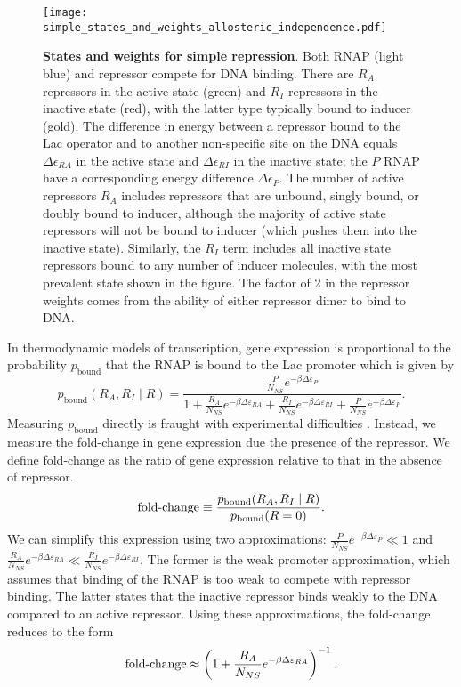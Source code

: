 \begin{figure}[h]
	\centering \texttt{[image: simple\_states\_and\_weights\_allosteric\_independence.pdf]}
	\caption{{\bf States and weights for simple repression}. Both RNAP (light blue)
		and repressor compete for DNA binding. There are $R_A$ repressors in the active
		state (green) and $R_I$ repressors in the inactive state (red), with the latter
		type typically bound to inducer (gold). The difference in energy between a
		repressor bound to the Lac operator and to another non-specific site on the DNA
		equals $\Delta\epsilon_{RA}$ in the active state and $\Delta\epsilon_{RI}$
		in the inactive state; the $P$ RNAP have a corresponding energy difference
		$\Delta\epsilon_{P}$. The number of active repressors $R_A$ includes
		repressors that are unbound, singly bound, or doubly bound to inducer, although
		the majority of active state repressors will not be bound to inducer (which
		pushes them into the inactive state). Similarly, the $R_I$ term includes all
		inactive state repressors bound to any number of inducer molecules, with the
		most prevalent state shown in the figure. The factor of 2 in the repressor
		weights comes from the ability of either repressor dimer to bind to DNA.}
	\label{figpolymeraseRepressorStates}
\end{figure}



In thermodynamic models of transcription, gene expression is proportional to the probability $p_{\text{bound}}$ that the RNAP is bound to the Lac promoter which is given by
\begin{equation}\label{eq2}
p_{\text{bound}}(R_A, R_I \mid R)=\frac{\frac{P}{N_{NS}}e^{-\beta  \Delta\varepsilon_{P}}}{1+\frac{R_A}{N_{NS}}e^{-\beta \Delta\varepsilon_{RA}}+\frac{R_I}{N_{NS}}e^{-\beta  \Delta\varepsilon_{RI}}+\frac{P}{N_{NS}}e^{-\beta\Delta\varepsilon_{P}}}.
\end{equation}
Measuring $p_{\text{bound}}$ directly is fraught with experimental difficulties
\cite{Bintu2005}. Instead, we measure the fold-change in gene expression due the presence of the repressor. We define fold-change as the ratio of gene
expression relative to that in the absence of repressor.
\begin{equation}\label{eq3}
\operatorname{fold-change}\equiv \frac{p_{\text{bound}}(R_A, R_I \mid R)}{p_{\text{bound}}(R = 0)}.
\end{equation}
We can simplify this expression using two approximations:
$\frac{P}{N_{NS}}e^{-\beta\Delta\varepsilon_{P}}\ll 1$ and
$\frac{R_A}{N_{NS}}e^{-\beta \Delta\varepsilon_{RA}} \ll \frac{R_I}{N_{NS}}e^{-\beta \Delta\varepsilon_{RI}}$. The former is the weak promoter
approximation, which assumes that binding of the RNAP is too weak to compete with
repressor binding\cite{Brewster2012}.
The latter states that the inactive repressor binds weakly to the
DNA compared to an active repressor. Using these
approximations, the fold-change reduces to the form
\begin{equation}\label{eq4}
\operatorname{fold-change} \approx \left(1+\frac{R_A}{N_{NS}}e^{-\beta  \Delta\varepsilon_{RA}}\right)^{-1}.
\end{equation}

